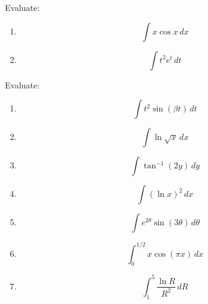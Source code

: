 \documentclass[12pt]{amsart}
\begin{document}
\begin{example}
	Evaluate:
	\begin{enumerate}
		\item
		      \begin{equation*}
			      \int x \cos x  \, dx
		      \end{equation*}
		      \vspace{5cm}
		\item
		      \begin{equation*}
			      \int t^2 e^t  \, dt
		      \end{equation*}
		      \vspace{5cm}
	\end{enumerate}
\end{example}
\begin{problem}
Evaluate:
\begin{enumerate}
	\item
	      \begin{equation*}
		      \int t^2 \sin (\beta t) \, dt
	      \end{equation*}
	      \vspace{5cm}
	\item
	      \begin{equation*}
		      \int \ln \sqrt{x} \, dx
	      \end{equation*}
	      \vspace{5cm}
	\item
	      \begin{equation*}
		      \int \tan^{-1} (2y) \, dy
	      \end{equation*}
	      \vspace{5cm}
	\item
	      \begin{equation*}
		      \int (\ln x)^2 \, dx
	      \end{equation*}
	      \vspace{5cm}
	\item
	      \begin{equation*}
		      \int e^{2\theta} \sin (3\theta) \, d\theta
	      \end{equation*}
	      \vspace{5cm}
	\item
	      \begin{equation*}
		      \int_0^{1/2} x \cos(\pi x) \, dx
	      \end{equation*}
	      \vspace{5cm}
	\item
	      \begin{equation*}
		      \int_1^5 \frac{\ln R}{R^2} \, dR
	      \end{equation*}
	      \vspace{5cm}
\end{enumerate}
\end{problem}
\end{document}
